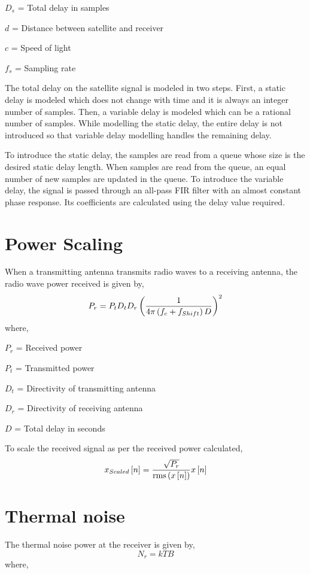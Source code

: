 \documentclass[11pt]{book}
\begin{document}
$D_{s}$ = Total delay in samples

$d$ = Distance between satellite and receiver

$c$ = Speed of light

$f_{s}$ = Sampling rate

The total delay on the satellite signal is modeled in two steps. First, a static delay is modeled which does not change with time and it is always an integer number of samples. Then, %
a variable delay is modeled which can be a rational number of samples. While modelling the static delay, the entire delay is not introduced so that variable delay modelling handles the remaining %
delay.

To introduce the static delay, the samples are read from a queue whose size is the desired static delay length. When samples are read from the queue, an equal number of new samples are %
updated in the queue. To introduce the variable delay, the signal is passed through an all-pass FIR filter with an almost constant phase response. Its coefficients are calculated %
using the delay value required.

\section{Power Scaling}
When a transmitting antenna transmits radio waves to a receiving antenna, the radio wave power received is given by,
\begin{equation}
    P_r = P_t D_t D_r \left(\frac{1}{4 \pi \left(f_c + f_{Shift}\right) D}\right)^2
\end{equation}
where,

$P_r$ = Received power

$P_t$ = Transmitted power

$D_t$ = Directivity of transmitting antenna 

$D_r$ = Directivity of receiving antenna 

$D$ = Total delay in seconds

To scale the received signal as per the received power calculated,
\begin{equation}
    x_{Scaled}{}\left[n\right] = \frac{\sqrt{P_r}}{\operatorname{rms}\left(x{}\left[n\right]\right)}x{}\left[n\right]
\end{equation}   

\section{Thermal noise}
The thermal noise power at the receiver is given by,
\begin{equation}
    N_r = k T B
\end{equation}
where,
\end{document}
